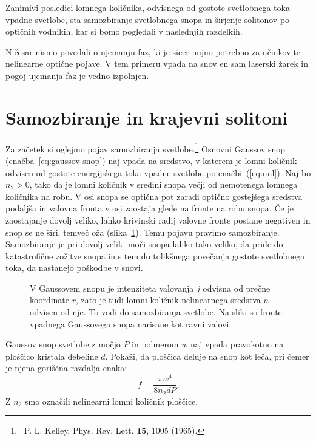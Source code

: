 Zanimivi posledici lomnega količnika, odvisnega od gostote svetlobnega toka vpadne svetlobe, 
sta samozbiranje svetlobnega snopa in širjenje solitonov po optičnih vodnikih, 
kar si bomo pogledali v naslednjih razdelkih.

\begin{remark}
Ničesar nismo povedali o ujemanju faz, ki je sicer nujno potrebno za učinkovite nelinearne 
optične pojave. V tem primeru vpada na snov en sam laserski žarek in pogoj ujemanja faz
je vedno izpolnjen. 
\end{remark}

\section{Samozbiranje in krajevni solitoni}
Za začetek si oglejmo pojav samozbiranja svetlobe.\footnote{~P. L. Kelley, 
Phys. Rev. Lett. $\mathbf{15}$, 1005 (1965).}
Osnovni Gaussov snop 
(enačba~\ref{eq:gaussov-snop}) naj vpada na sredstvo, v katerem je lomni 
količnik odvisen od gostote energijskega toka vpadne svetlobe po enačbi~(\ref{eq:nnl}).
Naj bo $n_{2}>0$, tako da je lomni količnik v sredini snopa večji 
od nemotenega lomnega količnika na robu. V osi snopa se optična pot 
zaradi optično gostejšega sredstva podaljša in valovna fronta 
v osi zaostaja glede na fronte na robu snopa. Če je zaostajanje dovolj veliko,
lahko krivinski radij valovne fronte postane negativen in snop se
ne širi, temveč oža (slika~\ref{fig:sf1}). Temu pojavu pravimo 
samozbiranje. Samozbiranje je pri dovolj
veliki moči snopa lahko tako veliko, da pride do katastrofične zožitve snopa
in s tem do tolikšnega povečanja gostote svetlobnega toka, da nastanejo
poškodbe v snovi.

\begin{figure}[ht]
\centering
\def\svgwidth{105truemm} 

\caption{V Gaussovem snopu je intenziteta valovanja $j$ odvisna od prečne koordinate $r$, 
zato je tudi lomni količnik nelinearnega sredstva  $n$ odvisen od nje. To vodi do 
 samozbiranja svetlobe. Na sliki so fronte vpadnega Gaussovega snopa narisane kot ravni valovi.}
\label{fig:sf1}
\end{figure}

\begin{naloga}
Gaussov snop svetlobe z močjo $P$ in polmerom $w$ naj vpada pravokotno na ploščico
kristala debeline $d$. Pokaži, da ploščica deluje na snop kot leča, pri čemer je njena
goriščna razdalja enaka:
\begin{equation}
f = \frac{\pi w^4}{8 n_2 d P}.
\end{equation}
Z $n_2$ smo označili nelinearni lomni količnik ploščice.
\end{naloga}

